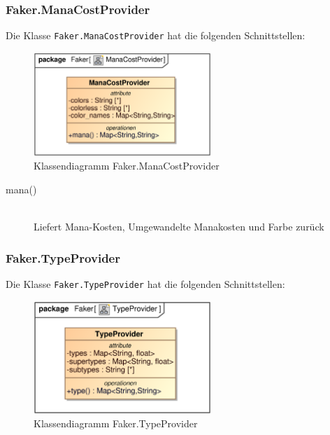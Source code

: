 \subsubsection{Faker.ManaCostProvider}
Die Klasse \verb|Faker.ManaCostProvider| hat die folgenden Schnittstellen:

\begin{figure}[H]
    \myfloatalign
    \includegraphics[width=0.6\textwidth]{gfx/MtGDeepAnalysis/ManaCostProvider.eps}
    \caption{Klassendiagramm Faker.ManaCostProvider}
    \label{fig:class:Faker.ManaCostProvider}
\end{figure}

\begin{description}
    \item[mana()] \hfill \\
    Liefert Mana-Kosten, Umgewandelte Manakosten und Farbe zurück
\end{description}

\subsubsection{Faker.TypeProvider}
Die Klasse \verb|Faker.TypeProvider| hat die folgenden Schnittstellen:

\begin{figure}[H]
    \myfloatalign
    \includegraphics[width=0.6\textwidth]{gfx/MtGDeepAnalysis/TypeProvider.eps}
    \caption{Klassendiagramm Faker.TypeProvider}
    \label{fig:class:Faker.TypeProvider}
\end{figure}

